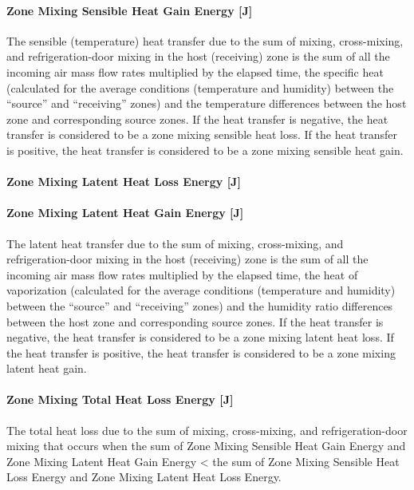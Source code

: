 \paragraph{Zone Mixing Sensible Heat Gain Energy {[}J{]}}\label{zone-mixing-sensible-heat-gain-energy-j}

The sensible (temperature) heat transfer due to the sum of mixing, cross-mixing, and refrigeration-door mixing in the host (receiving) zone is the sum of all the incoming air mass flow rates multiplied by the elapsed time, the specific heat (calculated for the average conditions (temperature and humidity) between the ``source'' and ``receiving'' zones) and the temperature differences between the host zone and corresponding source zones. If the heat transfer is negative, the heat transfer is considered to be a zone mixing sensible heat loss. If the heat transfer is positive, the heat transfer is considered to be a zone mixing sensible heat gain.

\paragraph{Zone Mixing Latent Heat Loss Energy {[}J{]}}\label{zone-mixing-latent-heat-loss-energy-j}

\paragraph{Zone Mixing Latent Heat Gain Energy {[}J{]}}\label{zone-mixing-latent-heat-gain-energy-j}

The latent heat transfer due to the sum of mixing, cross-mixing, and refrigeration-door mixing in the host (receiving) zone is the sum of all the incoming air mass flow rates multiplied by the elapsed time, the heat of vaporization (calculated for the average conditions (temperature and humidity) between the ``source'' and ``receiving'' zones) and the humidity ratio differences between the host zone and corresponding source zones. If the heat transfer is negative, the heat transfer is considered to be a zone mixing latent heat loss. If the heat transfer is positive, the heat transfer is considered to be a zone mixing latent heat gain.

\paragraph{Zone Mixing Total Heat Loss Energy {[}J{]}}\label{zone-mixing-total-heat-loss-energy-j}

The total heat loss due to the sum of mixing, cross-mixing, and refrigeration-door mixing that occurs when the sum of Zone Mixing Sensible Heat Gain Energy and Zone Mixing Latent Heat Gain Energy \textless{} the sum of Zone Mixing Sensible Heat Loss Energy and Zone Mixing Latent Heat Loss Energy.

